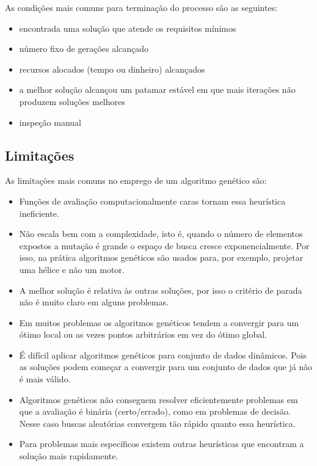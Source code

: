 As condições mais comuns para terminação do processo são as seguintes:

\begin{itemize}
\item
  encontrada uma solução que atende os requisitos mínimos
\item
  número fixo de gerações alcançado
\item
  recursos alocados (tempo ou dinheiro) alcançados
\item
  a melhor solução alcançou um patamar estável em que mais iterações não
  produzem soluções melhores
\item
  inspeção manual
\end{itemize}

\subsection{Limitações}

As limitações mais comuns no emprego de um algoritmo genético são:

\begin{itemize}
\item
  Funções de avaliação computacionalmente caras tornam essa heurística
  ineficiente.
\item
  Não escala bem com a complexidade, isto é, quando o número de
  elementos expostos a mutação é grande o espaço de busca cresce
  exponencialmente. Por isso, na prática algoritmos genéticos são
  usados para, por exemplo, projetar uma hélice e não um motor.
\item
  A melhor solução é relativa às outras soluções, por isso o critério de
  parada não é muito claro em alguns problemas.
\item
  Em muitos problemas os algoritmos genéticos tendem a convergir para
  um ótimo local ou as vezes pontos arbitrários em vez do ótimo global.
\item
  É difícil aplicar algoritmos genéticos para conjunto de dados
  dinâmicos. Pois as soluções podem começar a convergir para um conjunto
  de dados que já não é mais válido.
\item
  Algoritmos genéticos não conseguem resolver eficientemente problemas
  em que a avaliação é binária (certo/errado), como em problemas de
  decisão. Nesse caso buscas aleatórias convergem tão rápido quanto essa
  heurística.
\item
  Para problemas mais específicos existem outras heurísticas que
  encontram a solução mais rapidamente.
\end{itemize}

